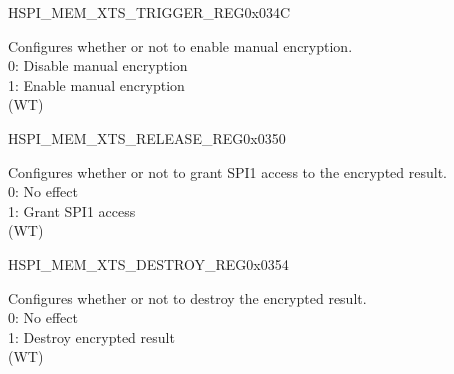 \begin{register}{H}{SPI\_MEM\_XTS\_TRIGGER\_REG}{0x034C}\label{regdesc:SPIMEMXTSTRIGGERREG}
%
%
\regnewline%
\begin{regdesc}\begin{reglist}
\label{fielddesc:SPIMEMXTSTRIGGER}\item [SPI\_MEM\_XTS\_TRIGGER] Configures whether or not to enable manual encryption. \\
0: Disable manual encryption\\
1: Enable manual encryption\\
(WT)
\end{reglist}\end{regdesc}
\end{register}

\begin{register}{H}{SPI\_MEM\_XTS\_RELEASE\_REG}{0x0350}\label{regdesc:SPIMEMXTSRELEASEREG}
%
%
\regnewline%
\begin{regdesc}\begin{reglist}
\label{fielddesc:SPIMEMXTSRELEASE}\item [SPI\_MEM\_XTS\_RELEASE] Configures whether or not to grant SPI1 access to the encrypted result. \\
0: No effect\\
1: Grant SPI1 access\\
(WT)
\end{reglist}\end{regdesc}
\end{register}

\begin{register}{H}{SPI\_MEM\_XTS\_DESTROY\_REG}{0x0354}\label{regdesc:SPIMEMXTSDESTROYREG}
%
%
\regnewline%
\begin{regdesc}\begin{reglist}
\label{fielddesc:SPIMEMXTSDESTROY}\item [SPI\_MEM\_XTS\_DESTROY] Configures whether or not to destroy the encrypted result. \\
0: No effect\\
1: Destroy encrypted result\\
(WT)
\end{reglist}\end{regdesc}
\end{register}


